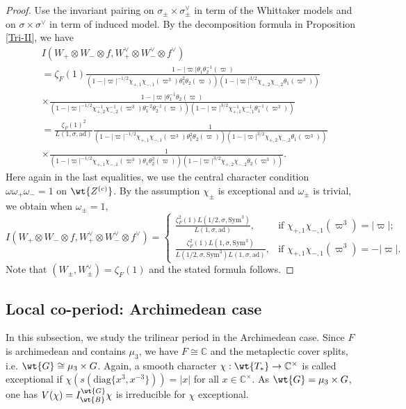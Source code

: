 \documentclass[11pt,reqno]{amsart}
\newcommand{\BC}{{\mathbb {C}}} \newcommand{\BD}{{\mathbb {D}}}
\newcommand{\ad}{{\mathrm{ad}}}\newcommand{\al}{{\mathrm{al}}}
\newcommand{\diag}{{\mathrm{diag}}}
\newcommand{\Sym}{{\mathrm{Sym}}}\newcommand{\sgn}{{\mathrm{sgn}}}
\theoremstyle{plain}
\theoremstyle{remark} \newtheorem{remark}[thm]{Remark}
\theoremstyle{definition} \newtheorem{exercise}[thm]{Exercise}
\theoremstyle{definition} \newtheorem{example}[thm]{Example} \newtheorem{condition}[thm]{Condition}
\numberwithin{equation}{section}
\renewcommand{\-}{\text{--}}
\begin{document}
\begin{proof}
Use the invariant pairing on $\sigma_{\pm}\times \sigma_{\pm}^\vee$ in term of the Whittaker models and on $\sigma\times\sigma^\vee$ in term of induced model. By the decomposition formula in Proposition \ref{Tri-II}, we have
\begin{align*}
&I( W_+\otimes W_-\otimes f, W_+^\vee\otimes W_-^\vee\otimes f^\vee)\\
&=\zeta_F(1)\frac{1-|\varpi|\theta_1\theta_2^{-1}(\varpi)}{(1-|\varpi|^{-1/2}\chi_{+,1}\chi_{-,1}(\varpi^3)\theta_1^2\theta_2(\varpi))(1-|\varpi|^{3/2}\chi_{+,2}\chi_{-,2}\theta_1(\varpi^3))}\\
&\times \frac{1-|\varpi|\theta_1^{-1}\theta_2(\varpi)}{(1-|\varpi|^{-1/2}\chi_{+,2}^{-1}\chi_{-,2}^{-1}(\varpi^3)\theta_1^{-2}\theta_2^{-1}(\varpi))(1-|\varpi|^{3/2}\chi_{+,1}^{-1}\chi_{-,1}^{-1}\theta_1^{-1}(\varpi^3))}\\
&=\frac{\zeta_F(1)^2}{L(1,\sigma,\ad)}\frac{1}{(1-|\varpi|^{-1/2}\chi_{+,1}\chi_{-,1}(\varpi^3)\theta_1^2\theta_2(\varpi))(1-|\varpi|^{3/2}\chi_{+,2}\chi_{-,2}
\theta_1(\varpi^3))}\\
&\times\frac{1}{(1-|\varpi|^{-1/2}\chi_{+,1}\chi_{-,1}(\varpi^3)\theta_1\theta_2^2(\varpi))(1-|\varpi|^{3/2}\chi_{+,2}\chi_{-,2}\theta_2(\varpi^3))}.
\end{align*}
Here again in the last equalities, we use the central character condition $\omega\omega_+\omega_-=1$ on $\wt{Z^{(c)}}$. By the assumption $\chi_\pm$ is exceptional and $\omega_{\pm}$ is trivial, we obtain when $\omega_\pm=1$, 
\[I( W_+\otimes W_-\otimes f, W_+^\vee\otimes W_-^\vee\otimes f^\vee)=\begin{cases}\frac{\zeta_F^2(1)L(1/2,\sigma,\Sym^3)}{L(1,\sigma,\ad)}, &\text{if } \chi_{+,1}\chi_{-,1}(\varpi^3)=|\varpi|;\\
\frac{\zeta_F^2(1)L(1,\sigma,\Sym^3)}{L(1/2,\sigma,\Sym^3)L(1,\sigma,\ad)}, &\text{if } \chi_{+,1}\chi_{-,1}(\varpi^3)=-|\varpi|.\end{cases}\]
Note that $(W_\pm,W_\pm^\vee)=\zeta_F(1)$ and the stated formula follows.
\end{proof}
\subsection{Local co-period: Archimedean case}\label{Archimedean}
In this subsection, we study the trilinear period in the Archimedean case. Since $F$ is archimedean and contains $\mu_3$, we have $F\cong\BC$ and the metaplectic cover splits, i.e. $\wt{G}\cong \mu_3\times G$. Again, a smooth character $\chi: \wt{T_*}\to\BC^\times$ is called exceptional if $\chi(s(\diag\{x^3,x^{-3}\}))=|x|$ for all $x\in \BC^\times$. As $\wt{G}=\mu_3\times G$, one has  $V(\chi)=I_{\wt{B}}^{\wt{G}}\chi$ is irreducible for $\chi$ exceptional. 
\end{document}
